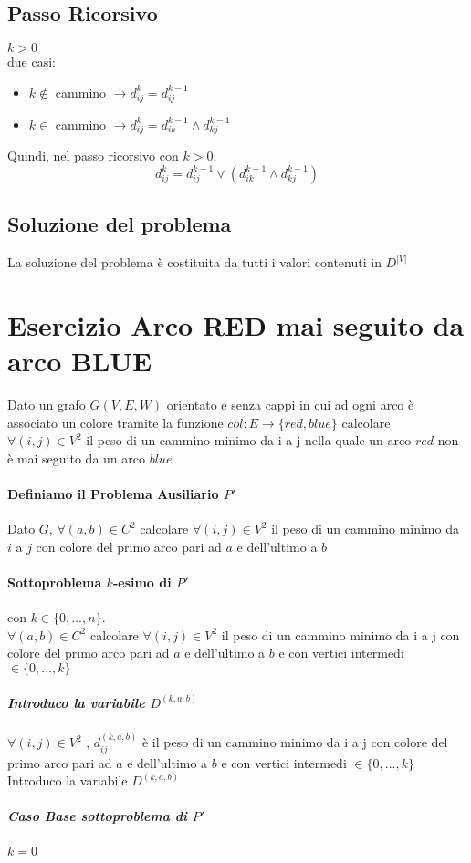 \documentclass[12pt, a4paper, openany]{book}
\begin{document}
	\subsection*{Passo Ricorsivo} $k>0$\\
	due casi:
	\begin{itemize}
		\item $k\notin$ cammino $\rightarrow d^k_{ij} = d^{k-1}_{ij}$
		\item $k \in$ cammino $\rightarrow d^k_{ij} = d^{k-1}_{ik} \land d^{k-1}_{kj}$
	\end{itemize}
	Quindi, nel passo ricorsivo con $k>0$:
	\begin{equation*}
		d^k_{ij} = d^{k-1}_{ij} \lor  (d^{k-1}_{ik} \land d^{k-1}_{kj})
	\end{equation*}

	\subsection*{Soluzione del problema}
	La soluzione del problema è costituita da tutti i valori contenuti in $D^{|V|}$

	\section{Esercizio Arco RED mai seguito da arco BLUE}
	Dato un grafo $G(V,E,W)$ orientato e senza cappi in cui ad ogni arco è associato un colore tramite la funzione $col: E\rightarrow \{red,blue\}$
	calcolare $\forall (i,j) \in V^2$ il peso di un cammino minimo da i a j nella quale un arco $red$ non è mai seguito da un arco $blue$

	\paragraph{Definiamo il Problema Ausiliario $P'$}
	Dato $G$, $\forall(a,b) \in C^2$ calcolare $\forall(i,j) \in V^2$ il peso di un cammino minimo da $i$ a $j$ con
	colore del primo arco pari ad $a$ e dell'ultimo a $b$

	\paragraph{Sottoproblema $k$-esimo di $P'$} con $k \in \{0,...,n\}$.
	\\$\forall(a,b) \in C^2$ calcolare $\forall(i,j) \in V^2$ il peso di un cammino minimo da i a j con
colore del primo arco pari ad $a$ e dell'ultimo a $b$ e con vertici intermedi $\in \{0,...,k\}$\\
\subparagraph{Introduco la variabile $D^{(k,a,b)}$}
$\forall(i,j)\in V^2$ , $d^{(k,a,b)}_{ij}$ è il peso di un cammino minimo da i a j  con
colore del primo arco pari ad $a$ e dell'ultimo a $b$ e con vertici intermedi $\in \{0,...,k\}$\\
Introduco la variabile $D^{(k,a,b)}$
\subparagraph{Caso Base sottoproblema di $P'$} $k = 0$
\end{document}
